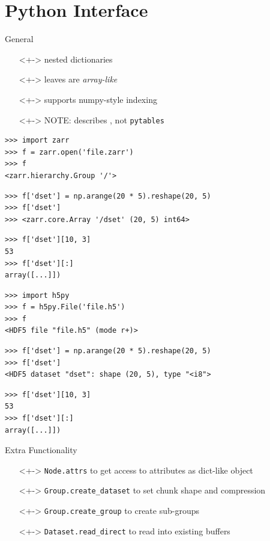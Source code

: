 \documentclass{beamer}
\begin{document}
\section{Python Interface}

\begin{frame}{General}
  \begin{itemize}
  \item[]<+-> nested dictionaries
  \item[]<+-> leaves are \textit{array-like}
  \item[]<+-> supports numpy-style indexing
  \item[]<+-> NOTE: describes \hfpy, not \texttt{pytables}
  \end{itemize}
\end{frame}

\begin{frame}[fragile]{\zarr}
  \begin{verbatim}
>>> import zarr
>>> f = zarr.open('file.zarr')
>>> f
<zarr.hierarchy.Group '/'>
  \end{verbatim}
  \pause

  \begin{verbatim}
>>> f['dset'] = np.arange(20 * 5).reshape(20, 5)
>>> f['dset']
>>> <zarr.core.Array '/dset' (20, 5) int64>
\end{verbatim}
  \pause

  \begin{verbatim}
>>> f['dset'][10, 3]
53
>>> f['dset'][:]
array([...]])
  \end{verbatim}
\end{frame}

\begin{frame}[fragile]{\hfpy}
  \begin{verbatim}
>>> import h5py
>>> f = h5py.File('file.h5')
>>> f
<HDF5 file "file.h5" (mode r+)>
  \end{verbatim}
  \pause

  \begin{verbatim}
>>> f['dset'] = np.arange(20 * 5).reshape(20, 5)
>>> f['dset']
<HDF5 dataset "dset": shape (20, 5), type "<i8">
\end{verbatim}
  \pause

  \begin{verbatim}
>>> f['dset'][10, 3]
53
>>> f['dset'][:]
array([...]])
  \end{verbatim}
\end{frame}

\begin{frame}{Extra Functionality}
  \begin{itemize}
  \item[]<+-> \texttt{Node.attrs} to get access to attributes as dict-like object
  \item[]<+-> \texttt{Group.create\_dataset} to set chunk shape and compression
  \item[]<+-> \texttt{Group.create\_group} to create sub-groups
  \item[]<+-> \texttt{Dataset.read\_direct} to read into existing buffers
  \end{itemize}
\end{frame}
\end{document}
